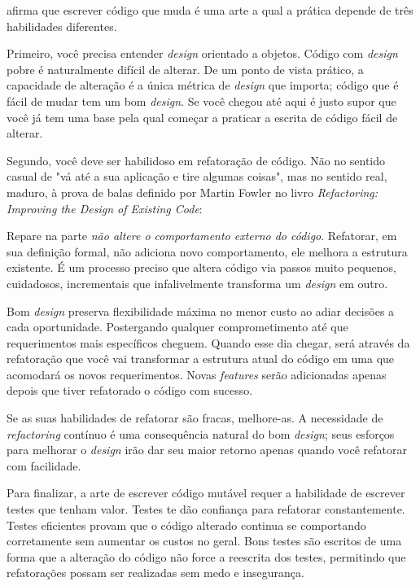 
\cite{Sandi} afirma que escrever código que muda é uma arte a qual a prática depende de três habilidades diferentes.

Primeiro, você precisa entender \textit{design} orientado a objetos. Código com \textit{design} pobre é naturalmente difícil de alterar. De um ponto de vista prático, a capacidade de alteração é a única métrica de \textit{design} que importa; código que é fácil de mudar tem um bom \textit{design}. Se você chegou até aqui é justo supor que você já tem uma base pela qual começar a praticar a escrita de código fácil de alterar.

Segundo, você deve ser habilidoso em refatoração de código. Não no sentido casual de "vá até a sua aplicação e tire algumas coisas", mas no sentido real, maduro, à prova de balas definido por Martin Fowler no livro \textit{Refactoring: Improving the Design of Existing Code}\cite{Fowler1999}:


Repare na parte \textit{não altere o comportamento externo do código}. Refatorar, em sua definição formal, não adiciona novo comportamento, ele melhora a estrutura existente. É um processo preciso que altera código via passos muito pequenos, cuidadosos, incrementais que infalivelmente transforma um \textit{design} em outro.

Bom \textit{design} preserva flexibilidade máxima no menor custo ao adiar decisões a cada oportunidade. Postergando qualquer comprometimento até que requerimentos mais específicos cheguem. Quando esse dia chegar, será através da refatoração que você vai transformar a estrutura atual do código em uma que acomodará os novos requerimentos. Novas \textit{features} serão adicionadas apenas depois que tiver refatorado o código com sucesso.

Se as suas habilidades de refatorar são fracas, melhore-as. A necessidade de  \textit{refactoring} contínuo é uma consequência natural do bom \textit{design}; seus esforços para melhorar o \textit{design} irão dar seu maior retorno apenas quando você refatorar com facilidade.

Para finalizar, a arte de escrever código mutável requer a habilidade de escrever testes que tenham valor. Testes te dão confiança para refatorar constantemente. Testes eficientes provam que o código alterado continua se comportando corretamente sem aumentar os custos no geral. Bons testes são escritos de uma forma que a alteração do código não force a reescrita dos testes, permitindo que refatorações possam ser realizadas sem medo e insegurança.

